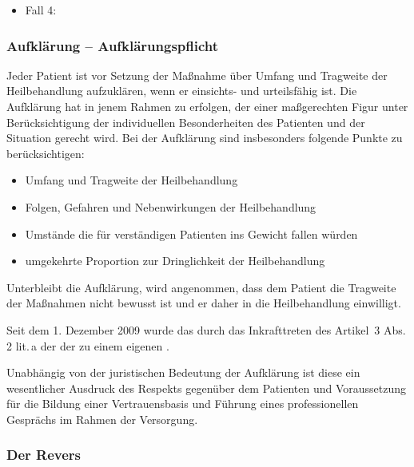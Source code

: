 {
\begin{itemize}
  \item Fall 4: 
  \dotfill{}
\end{itemize}
}
{}
{}
{}
{}



\subsubsection{Aufklärung -- Aufklärungspflicht}

\Text
{{\TxBeschreibung}}%
{%
\label{topic:aufklaerung}%
%
%
Jeder Patient ist vor Setzung der Maßnahme über Umfang und
Tragweite der Heilbehandlung aufzuklären, wenn er einsichts-
und urteilsfähig ist. Die Aufklärung hat in jenem Rahmen zu
erfolgen, der einer
maßgerechten Figur unter Berücksichtigung der
individuellen Besonderheiten des Patienten und der
Situation gerecht wird. Bei der Aufklärung sind
insbesonders folgende Punkte zu berücksichtigen:

\begin{itemize}
    \item Umfang und Tragweite der  Heilbehandlung
    \item Folgen, Gefahren und Nebenwirkungen der
    Heilbehandlung
    \item Umstände die für verständigen Patienten ins
    Gewicht fallen würden
    \item umgekehrte Proportion zur Dringlichkeit der
    Heilbehandlung
  \end{itemize}

Unterbleibt die Aufklärung, wird angenommen, dass dem
Patient die Tragweite der Maßnahmen nicht bewusst ist und er
daher  in die Heilbehandlung einwilligt.

Seit dem 1. Dezember 2009 wurde das  durch das Inkrafttreten des Artikel~3 Abs.\,2
lit.\,a der  der  zu einem
eigenen .

Unabhängig von der juristischen Bedeutung der Aufklärung ist
diese ein wesentlicher Ausdruck des Respekts gegenüber dem
Patienten und Voraussetzung für die Bildung einer
Vertrauensbasis und Führung eines professionellen Gesprächs
im Rahmen der Versorgung. 
}%


\subsubsection{Der Revers}


